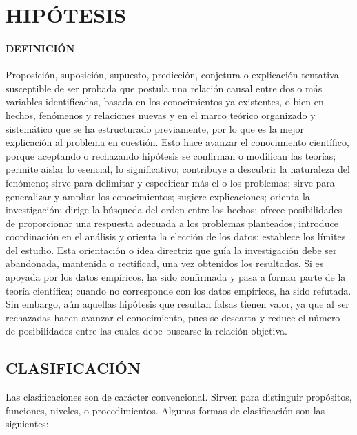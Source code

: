 \section{HIPÓTESIS}

\paragraph{DEFINICIÓN}
Proposición, suposición, supuesto, predicción, conjetura o explicación tentativa susceptible de ser probada que postula una relación causal entre dos o más variables identificadas, basada en los conocimientos ya existentes, o bien en hechos, fenómenos y relaciones nuevas y en el marco teórico organizado y sistemático que se ha estructurado previamente, por lo que es la mejor explicación al problema en cuestión. Esto hace avanzar el conocimiento científico, porque aceptando o rechazando hipótesis se confirman o modifican las teorías; permite aislar lo esencial, lo significativo; contribuye a descubrir la naturaleza del fenómeno; sirve para delimitar y especificar más el o los problemas; sirve para generalizar y ampliar los conocimientos; sugiere explicaciones; orienta la investigación; dirige la búsqueda del orden entre los hechos; ofrece posibilidades de proporcionar una respuesta adecuada a los problemas planteados; introduce coordinación en el análisis y orienta la elección de los datos; establece los límites del estudio. Esta orientación o idea directriz que guía la investigación debe ser abandonada, mantenida o rectificad, una vez obtenidos los resultados. Si es apoyada por los datos empíricos, ha sido confirmada y pasa a formar parte de la teoría científica; cuando no corresponde con los datos empíricos, ha sido refutada. Sin embargo, aún aquellas hipótesis que resultan falsas tienen valor, ya que al ser rechazadas hacen avanzar el conocimiento, pues se descarta y reduce el número de posibilidades entre las cuales debe buscarse la relación objetiva.


\subsection{CLASIFICACIÓN}
Las clasificaciones son de carácter convencional. Sirven para distinguir propósitos, funciones, niveles, o procedimientos. Algunas formas de clasificación son las siguientes:

